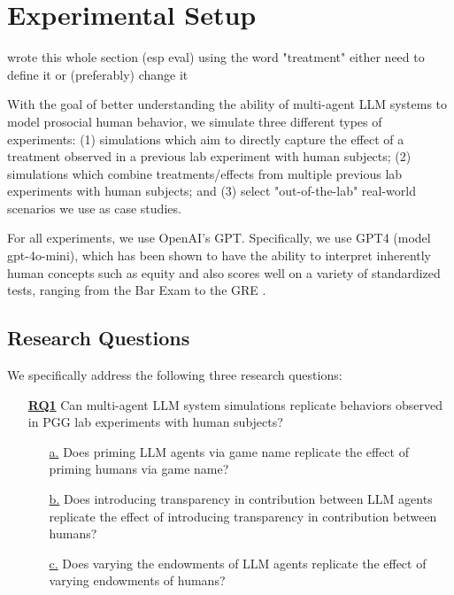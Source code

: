 
\section{Experimental Setup}

\color{red}wrote this whole section (esp eval) using the word "treatment" either need to define it or (preferably) change it\color{black}

With the goal of better understanding the ability of multi-agent LLM systems to model prosocial human behavior, we simulate three different types of experiments: (1) simulations which aim to directly capture the effect of a treatment observed in a previous lab experiment with human subjects; (2) simulations which combine treatments/effects from multiple previous lab experiments with human subjects; and (3) select "out-of-the-lab" real-world scenarios we use as case studies.

For all experiments, we use OpenAI's GPT. Specifically, we use GPT4 (model gpt-4o-mini), which has been shown to have the ability to interpret inherently human concepts such as equity and also scores  well on a variety of standardized tests, ranging from the Bar Exam to the GRE \cite{openai2023gpt4}.

\subsection{Research Questions}

We specifically address the following three research questions:

\bigskip

\begin{itemize}[itemindent=2.5em]
  \item[\underline{\textbf{RQ1}}] Can multi-agent LLM system simulations replicate behaviors observed in PGG lab experiments with human subjects?
\begin{itemize} [leftmargin=0.5in]
\item[\underline{a.}] Does priming LLM agents via game name replicate the effect of priming humans via game name?
\item[\underline{b.}] Does introducing transparency in contribution between LLM agents replicate the effect of introducing transparency in contribution between humans?
\item[\underline{c.}] Does varying the endowments of LLM agents replicate the effect of varying endowments of humans?
\end{itemize}
\end{itemize}

